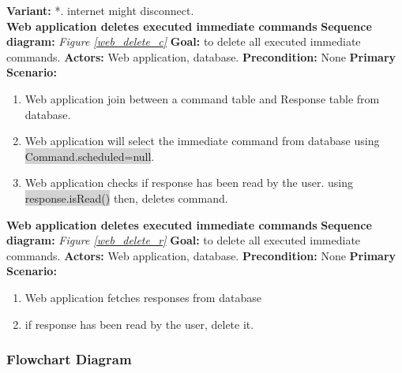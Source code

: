 \documentclass[12pt, oneside, a4paper]{book}
\newcommand{\code}[1]{{\color{red}\colorbox{lightgray}{#1}}}
\newcommand\boldcolor[1]{\textcolor{bold}{\textbf{#1}}}
\begin{document}
				\textbf{Variant:}\newline	
				\hspace*{5mm}*. internet might disconnect.\\
				\newline\boldcolor{Web application deletes executed immediate commands}
				\newline\textbf{Sequence diagram:} \textit{Figure \ref{web_delete_c}}
				\newline\textbf{Goal:} to delete all executed immediate commands.
				\newline\textbf{Actors:} Web application, database.
				\newline\textbf{Precondition:} None
				\newline\textbf{Primary Scenario:}	
				\begin{enumerate}[label*=\arabic*.]
					\item Web application join between a command table and Response table from database.  
					\item  Web application will select the immediate command from database using \code{Command.scheduled=null}.
					\item Web application checks if response has been read by the user. using \code{response.isRead()} then, deletes command.
				\end{enumerate}
				\boldcolor{Web application deletes executed immediate commands}
				\newline\textbf{Sequence diagram:} \textit{Figure \ref{web_delete_r}}
				\newline\textbf{Goal:} to delete all executed immediate commands.
				\newline\textbf{Actors:} Web application, database.
				\newline\textbf{Precondition:} None
				\newline\textbf{Primary Scenario:}	
				\begin{enumerate}[label*=\arabic*.]
					\item Web application fetches responses from database 
					\item if response has been read by the user, delete it.
				\end{enumerate}	
				
				\newpage\subsubsection{Flowchart Diagram}
\end{document}
